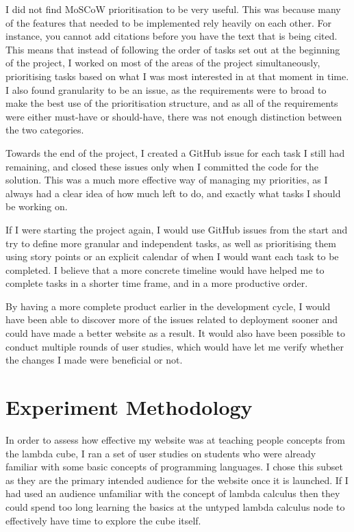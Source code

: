 \documentclass{l4proj}
\begin{document}
I did not find MoSCoW prioritisation to be very useful.  This was because many of the features that needed to be implemented rely heavily on each other.  For instance, you cannot add citations before you have the text that is being cited.  This means that instead of following the order of tasks set out at the beginning of the project, I worked on most of the areas of the project simultaneously, prioritising tasks based on what I was most interested in at that moment in time.  I also found granularity to be an issue, as the requirements were to broad to make the best use of the prioritisation structure, and as all of the requirements were either must-have or should-have, there was not enough distinction between the two categories.

Towards the end of the project, I created a GitHub issue for each task I still had remaining, and closed these issues only when I committed the code for the solution.  This was a much more effective way of managing my priorities, as I always had a clear idea of how much left to do, and exactly what tasks I should be working on.

If I were starting the project again, I would use GitHub issues from the start and try to define more granular and independent tasks, as well as prioritising them using story points or an explicit calendar of when I would want each task to be completed.  I believe that a more concrete timeline would have helped me to complete tasks in a shorter time frame, and in a more productive order.

By having a more complete product earlier in the development cycle, I would have been able to discover more of the issues related to deployment sooner and could have made a better website as a result.  It would also have been possible to conduct multiple rounds of user studies, which would have let me verify whether the changes I made were beneficial or not.

\section{Experiment Methodology}

In order to assess how effective my website was at teaching people concepts from the lambda cube, I ran a set of user studies on students who were already familiar with some basic concepts of programming languages.  I chose this subset as they are the primary intended audience for the website once it is launched.  If I had used an audience unfamiliar with the concept of lambda calculus then they could spend too long learning the basics at the untyped lambda calculus node to effectively have time to explore the cube itself.
\end{document}
